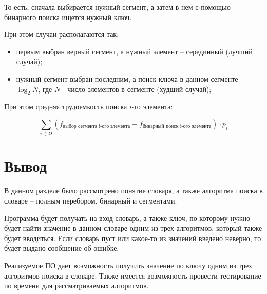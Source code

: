 То есть, сначала выбирается нужный сегмент, а затем в нем с помощью бинарного поиска ищется нужный ключ.


При этом случаи располагаются так:
\begin{itemize}
	\item первым выбран верный сегмент, а нужный элемент -- серединный (лучший случай);
	\item нужный сегмент выбран последним, а поиск ключа в данном сегменте -- $\log_2 N$, где $N$ - число элементов в сегменте (худший случай);
\end{itemize}


При этом средняя трудоемкость поиска $i$-го элемента:

\begin{equation}
	\sum_{i \in \Omega}{\left(f_{\text{выбор сегмента i-ого элемента}} + f_{\text{бинарный поиск i-ого элемента}}\right)} \cdot p_i
\end{equation}



\section{Вывод}

В данном разделе было рассмотрено понятие словаря, а также алгоритма поиска в словаре -- полным перебором, бинарный и сегментами.

Программа будет получать на вход словарь, а также ключ, по которому нужно будет найти значение в данном словаре одним из трех алгоритмов, который также будет вводиться. Если словарь пуст или какое-то из значений введено неверно, то будет выдано сообщение об ошибке.

Реализуемое ПО дает возможность получить значение по ключу одним из трех алгоритмов поиска в словаре. Также имеется возможность провести тестирование по времени для рассматриваемых алгоритмов.
